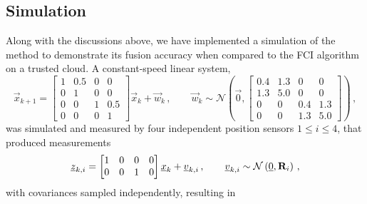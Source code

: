 \subsection{Simulation}\label{subsec:cloud_fusion:secfci_simulation}
Along with the discussions above, we have implemented a simulation of the method to demonstrate its fusion accuracy when compared to the FCI algorithm on a trusted cloud. A constant-speed linear system, 
\begin{equation}\label{eq:cloud_fusion:secfci_system_model}
    \vec{x}_{k+1} = 
    \begin{bmatrix}
        1 & 0.5 & 0 & 0\\
        0 & 1 & 0 & 0\\
        0 & 0 & 1 & 0.5\\
        0 & 0 & 0 & 1
    \end{bmatrix}\vec{x}_k + \vec{w}_k\,,\qquad \vec{w}_k\sim\mathcal{N}\left(\vec{0},
    \begin{bmatrix}
        0.4 & 1.3 & 0 & 0\\
        1.3 & 5.0 & 0 & 0\\
        0 & 0 & 0.4 & 1.3\\
        0 & 0 & 1.3 & 5.0
    \end{bmatrix}
    \right)\,,
\end{equation}
was simulated and measured by four independent position sensors $1\leq i\leq 4$, that produced measurements 
\begin{equation}\label{eq:cloud_fusion:secfci_measurement_model}
    {\underline{z}}_{k,i} = 
    \begin{bmatrix}
        1 & 0 & 0 & 0\\
        0 & 0 & 1 & 0
     \end{bmatrix}{\underline{x}}_k + {\underline{v}}_{k,i}\,,\qquad {\underline{v}}_{k,i}\sim\mathcal{N}\left({\underline{0}},{{\mathbf{R}}}_i\right)\,,
\end{equation}
with covariances sampled independently, resulting in
